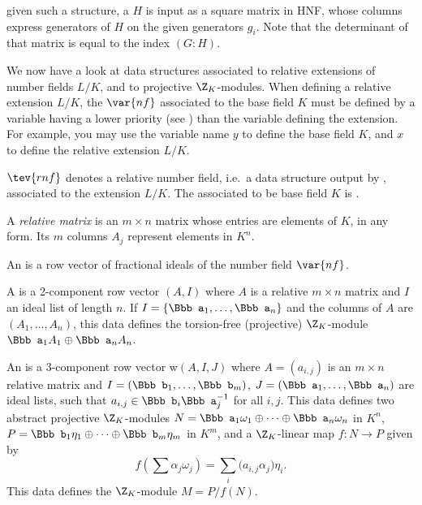 \item given such a structure, a  $H$ is input as a square
matrix in HNF, whose columns express generators of $H$ on the given generators
$g_i$. Note that the determinant of that matrix is equal to the index $(G:H)$.


We now have a look at data structures associated to relative extensions
of number fields $L/K$, and to projective $\Z_K$-modules. When defining a
relative extension $L/K$, the $\var{nf}$ associated to the base field $K$
must be defined by a variable having a lower priority (see
) than the variable defining the extension. For example,
you may use the variable name $y$ to define the base field $K$, and $x$ to
define the relative extension $L/K$.

\label{se:ZKmodules}

\item $\tev{rnf}$ denotes a relative number field, i.e.~a data structure
output by , associated to the extension $L/K$. The 
associated to be base field $K$ is .

\item A \emph{relative matrix} is an $m\times n$ matrix whose entries are
elements of $K$, in any form. Its $m$ columns $A_j$ represent elements
in $K^n$.

\item An  is a row vector of fractional ideals of the number
field $\var{nf}$.

\item A  is a 2-component row vector $(A,I)$ where $A$
is a relative $m\times n$ matrix and $I$ an ideal list of length $n$. If $I =
\{{\Bbb a}_1,\dots, {\Bbb a}_n\}$ and the columns of $A$ are $(A_1,\dots,
A_n)$, this data defines the torsion-free (projective) $\Z_K$-module ${\Bbb
a}_1 A_1\oplus {\Bbb a}_n A_n$.

\item An  is a 3-component row vector w$(A,I,J)$
where $A = (a_{i,j})$ is an $m\times n$ relative matrix and $I = ({\Bbb
b}_1,\dots, {\Bbb b}_m)$, $J = ({\Bbb a}_1,\dots, {\Bbb a}_n)$ are ideal
lists, such that $a_{i,j} \in {\Bbb b}_i {\Bbb a}_j^{-1}$ for all $i,j$. This
data defines two abstract projective $\Z_K$-modules $N = {\Bbb
a_1}\omega_1\oplus \cdots\oplus {\Bbb a_n}\omega_n $ in $K^n$, $P = {\Bbb
b_1}\eta_1\oplus \cdots\oplus {\Bbb b_m}\eta_m$ in $K^m$, and a $\Z_K$-linear
map $f:N\to P$ given by
$$ f(\sum \alpha_j\omega_j) = \sum_i \Big(a_{i,j}\alpha_j\Big) \eta_i.$$
This data defines the $\Z_K$-module $M = P/f(N)$.

